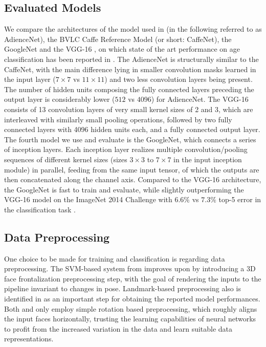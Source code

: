 \documentclass[10pt,twocolumn,letterpaper]{article}
\begin{document}
\subsection{Evaluated Models}
We compare the architectures of the model used in \cite{levi2015age} (in the following referred to as AdienceNet), the BVLC Caffe Reference Model \cite{jia2014caffe} (or short: CaffeNet), the GoogleNet \cite{szegedy2015going} and the VGG-16 \cite{simonyan2014very}, on which state of the art performance on age classification has been reported in \cite{rothe2016deep}. The AdienceNet is structurally similar to the CaffeNet, with the main difference lying in smaller convolution masks learned in the input layer ($7\times 7$ vs $11\times 11$) and two less convolution layers being present. The number of hidden units composing the fully connected layers preceding the output layer is considerably lower ($512$ vs $4096$) for AdienceNet. The VGG-16 consists of 13 convolution layers of very small kernel sizes of 2 and 3, which are interleaved with  similarly small pooling operations, followed by two fully connected layers with 4096 hidden units each, and a fully connected output layer.
The fourth model we use and evaluate is the GoogleNet, which connects a series of inception layers.
Each inception layer realizes multiple convolution/pooling sequences of different kernel sizes (sizes $3\times 3$ to $7\times 7$ in the input inception module) in parallel, feeding from the same input tensor, of which the outputs are then concatenated along the channel axis. Compared to the VGG-16 architecture, the GoogleNet is fast to train and evaluate, while slightly outperforming the VGG-16 model on the ImageNet 2014 Challenge with $6.6\%$ vs $7.3\%$ top-5 error in the classification task \cite{russakovsky2015imagenet}.


\subsection{Data Preprocessing}
One choice to be made for training and classification is regarding data preprocessing.
The SVM-based system from \cite{hassner2015effective} improves upon \cite{eidinger2014age} by introducing a 3D face frontalization preprocessing step, with the goal of rendering the inputs to the pipeline invariant to changes in pose.
Landmark-based preprocessing also is identified in \cite{dehghan2017dager} as an important step for obtaining the reported model performances.
Both \cite{levi2015age} and \cite{rothe2016deep} only employ simple rotation based preprocessing, which roughly aligns the input faces horizontally, trusting the learning capabilities of neural networks to profit from the increased variation in the data and learn suitable data representations.
\end{document}
